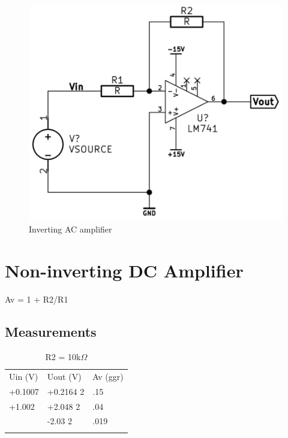 \documentclass[]{article}
\begin{document}
\begin{figure}[htbp]
\centering
\includegraphics[scale=0.5]{img/invACamp.png}
\caption{Inverting AC amplifier}
\end{figure}

\section{Non-inverting DC Amplifier}\label{non-inverting-dc-amplifier}

Av = 1 + R2/R1

\subsection{Measurements}\label{measurements-2}

\begin{longtable}[c]{@{}lll@{}}
\toprule\addlinespace
Uin (V) & Uout (V) & Av (ggr)
\\\addlinespace
\midrule\endhead
+0.1007 & +0.2164 2 & .15
\\\addlinespace
+1.002 & +2.048 2 & .04
\\\addlinespace
-1.005 & -2.03 2 & .019
\\\addlinespace
\bottomrule
\addlinespace
\caption{R2 = 10k$\Omega$}
\end{longtable}
\end{document}
